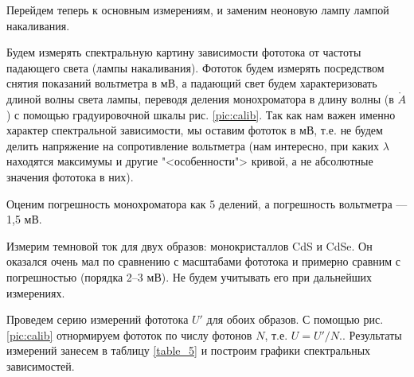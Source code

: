 \documentclass[12pt]{kiarticle}
\newcommand{\an}{\ensuremath{\mathring{A}}}
\begin{document}
	Перейдем теперь к основным измерениям, и заменим неоновую лампу лампой накаливания.
	
	Будем измерять спектральную картину зависимости фототока от частоты падающего света (лампы накаливания). Фототок будем измерять посредством снятия показаний вольтметра в мВ, а падающий свет будем характеризовать длиной волны света лампы, переводя деления монохроматора в длину волны (в $ \an $) с помощью градуировочной шкалы рис. \ref{pic:calib}. Так как нам важен именно характер спектральной зависимости, мы оставим фототок в мВ, т.е. не будем делить напряжение на сопротивление вольтметра (нам интересно, при каких $ \lambda $ находятся максимумы и другие "<особенности"> кривой, а не абсолютные значения фототока в них).
	
	Оценим погрешность монохроматора как 5 делений, а погрешность вольтметра --- 1,5 мВ.

	Измерим темновой ток для двух образов: монокристаллов CdS и CdSe. Он оказался очень мал по сравнению с масштабами фототока и примерно сравним с погрешностью (порядка 2--3 мВ). Не будем учитывать его при дальнейших измерениях.
	
	Проведем серию измерений фототока $ U' $ для обоих образов. С помощью рис. \ref{pic:calib} отнормируем фототок по числу фотонов $ N $, т.е. $ U = U'/N. $. Результаты измерений занесем в таблицу \ref{table_5} и построим графики спектральных зависимостей.
	
\end{document}
